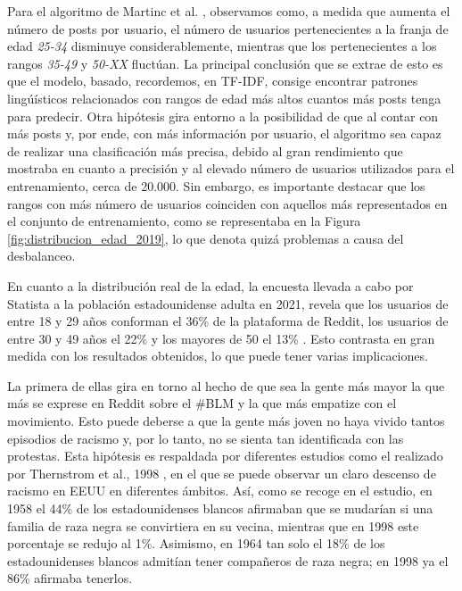 \bigskip
Para el algoritmo de Martinc et al. \cite{martinc2019hot}, observamos
como, a medida que aumenta el número de posts por usuario, el número de usuarios pertenecientes a la franja de edad \textit{25-34} disminuye
considerablemente, mientras que los pertenecientes a los rangos \textit{35-49} y \textit{50-XX} fluctúan.
La principal conclusión que se extrae de esto es que el modelo, basado, recordemos, en TF-IDF, consige encontrar patrones lingúísticos
relacionados con rangos de edad más altos cuantos más posts tenga para predecir.
Otra hipótesis gira entorno a la posibilidad de que al contar con más posts y, por ende, con más información por usuario,
el algoritmo sea capaz de realizar una clasificación más precisa, debido al gran rendimiento que mostraba en cuanto
a precisión y al elevado número de usuarios utilizados para el entrenamiento, cerca de 20.000.
Sin embargo, es importante destacar que los rangos con más número de usuarios coinciden con aquellos
más representados en el conjunto de entrenamiento, como se representaba en la Figura \ref{fig:distribucion_edad_2019}, lo que denota quizá problemas
a causa del desbalanceo.

\bigskip
En cuanto a la distribución real de la edad, la encuesta llevada a cabo por Statista a la población estadounidense adulta en 2021,
revela que los usuarios de entre 18 y 29 años conforman el 36\% de la plataforma de Reddit, los usuarios de entre 30 y 49 años el 22\% y los mayores de 50 el 13\% \cite{statistaedad}.
Esto contrasta en gran medida con los resultados obtenidos, lo que puede tener varias implicaciones.

\bigskip
La primera de ellas gira en torno
al hecho de que sea la gente más mayor la que más se exprese en Reddit sobre el \#BLM y la que más empatize con el movimiento. Esto
puede deberse a que la gente más joven no haya vivido tantos episodios de racismo y, por lo tanto, no se sienta tan identificada con las protestas.
Esta hipótesis es respaldada por diferentes estudios como el realizado por Thernstrom et al., 1998 \cite{thernstrom1998black}, en el que se puede observar un claro descenso de
racismo en EEUU en diferentes ámbitos. Así, como se recoge en el estudio, en 1958 el 44\% de los estadounidenses blancos afirmaban que se mudarían si
una familia de raza negra se convirtiera en su vecina, mientras que en 1998 este porcentaje se redujo al 1\%. Asimismo, en 1964 tan solo el 18\% de los estadounidenses blancos
admitían tener compañeros de raza negra; en 1998 ya el 86\% afirmaba tenerlos.

